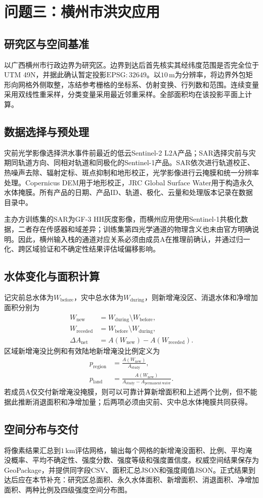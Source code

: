 \section{问题三：横州市洪灾应用}

\subsection{研究区与空间基准}

以广西横州市行政边界为研究区。边界到达后首先核实其经纬度范围是否完全位于UTM 49N，并据此确认暂定投影$\mathrm{EPSG:32649}$。以$10\,\mathrm{m}$为分辨率，将边界外包矩形向网格外侧取整，冻结参考栅格的坐标系、仿射变换、行列数和范围。连续变量采用双线性重采样，分类变量采用最近邻重采样。全部面积均在该投影平面上计算。

\subsection{数据选择与预处理}

灾前光学影像选择洪水事件前最近的低云Sentinel-2 L2A产品；SAR选择灾前与灾期同轨道方向、同相对轨道和同极化的Sentinel-1产品。SAR依次进行轨道校正、热噪声去除、辐射定标、斑点抑制和地形校正，光学影像进行云掩膜和统一分辨率处理。Copernicus DEM用于地形校正，JRC Global Surface Water用于构造永久水体掩膜。所有产品的日期、产品ID、轨道、极化、云量和处理版本记录在数据目录中。

主办方训练集的SAR为GF-3 HH灰度影像，而横州应用使用Sentinel-1共极化数据，二者存在传感器和域差异；训练集第四光学通道的物理含义也未由官方明确说明。因此，横州输入栈的通道对应关系必须由成员A在推理前确认，并通过归一化、跨区域验证和不确定性结果评估域偏移影响。

\subsection{水体变化与面积计算}

记灾前总水体为$W_{\mathrm{before}}$，灾中总水体为$W_{\mathrm{during}}$，则新增淹没区、消退水体和净增加面积分别为
\begin{align}
 W_{\mathrm{new}}&=W_{\mathrm{during}}\setminus W_{\mathrm{before}},\\
 W_{\mathrm{receded}}&=W_{\mathrm{before}}\setminus W_{\mathrm{during}},\\
 \Delta A_{\mathrm{net}}&=A(W_{\mathrm{new}})-A(W_{\mathrm{receded}}).
\end{align}
区域新增淹没比例和有效陆地新增淹没比例定义为
\begin{align}
 p_{\mathrm{region}}&=\frac{A(W_{\mathrm{new}})}{A_{\mathrm{study}}},\\
 p_{\mathrm{land}}&=\frac{A(W_{\mathrm{new}})}
 {A_{\mathrm{study}}-A_{\mathrm{permanent\ water}}}.
\end{align}
若成员A仅交付新增淹没掩膜，则可以可靠计算新增面积和上述两个比例，但不能据此推断消退面积和净增加量；后两项必须由灾前、灾中总水体掩膜共同获得。

\subsection{空间分布与交付}

将像素结果汇总到$1\,\mathrm{km}$评估网格，输出每个网格的新增淹没面积、比例、平均淹没概率、平均不确定性、强度分数、强度等级和强度置信度。权威空间结果保存为GeoPackage，并提供同字段CSV、面积汇总JSON和强度阈值JSON。正式结果到达后应在本节补充：研究区总面积、永久水体面积、新增面积、消退面积、净增加面积、两种比例及四级强度空间分布图。
